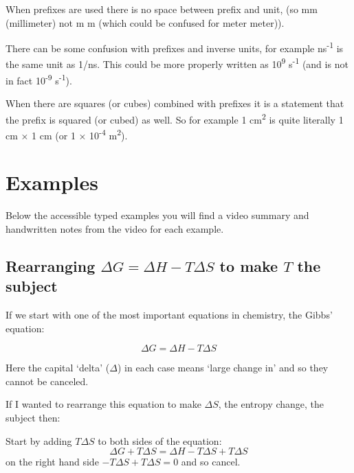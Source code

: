 \documentclass[
]{book}
\begin{document}
When prefixes are used there is no space between prefix and unit, (so mm (millimeter) not m m (which could be confused for meter meter)).

There can be some confusion with prefixes and inverse units, for example ns\textsuperscript{-1} is the same unit as 1/ns. This could be more properly written as 10\textsuperscript{9} s\textsuperscript{-1} (and is not in fact 10\textsuperscript{-9} s\textsuperscript{-1}).

When there are squares (or cubes) combined with prefixes it is a statement that the prefix is squared (or cubed) as well. So for example 1 cm\textsuperscript{2} is quite literally 1 cm × 1 cm (or 1 × 10\textsuperscript{-4} m\textsuperscript{2}).

\hypertarget{examples}{%
\section{Examples}\label{examples}}

Below the accessible typed examples you will find a video summary and handwritten notes from the video for each example.

\hypertarget{rearranging-delta-g-delta-h---t-delta-s-to-make-t-the-subject}{%
\subsection{\texorpdfstring{Rearranging \(\Delta G = \Delta H - T \Delta S\) to make \(T\) the subject}{Rearranging \textbackslash Delta G = \textbackslash Delta H - T \textbackslash Delta S to make T the subject}}\label{rearranging-delta-g-delta-h---t-delta-s-to-make-t-the-subject}}

If we start with one of the most important equations in chemistry, the Gibbs' equation:

\begin{equation*}
\Delta G = \Delta H - T \Delta S
\end{equation*}

Here the capital `delta' (\(\Delta\)) in each case means `large change in' and so they cannot be canceled.

If I wanted to rearrange this equation to make \(\Delta S\), the entropy change, the subject then:

Start by adding \(T\Delta S\) to both sides of the equation:
\begin{equation*}
\Delta G + T \Delta S= \Delta H - T \Delta S + T \Delta S
\end{equation*}
on the right hand side \(- T \Delta S + T \Delta S=0\) and so cancel.
\end{document}
